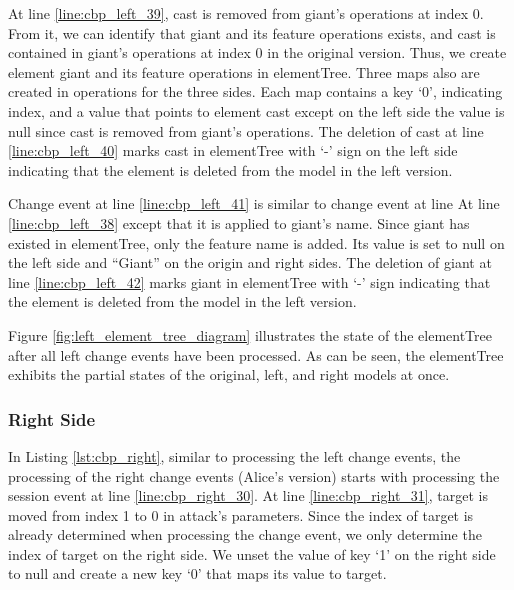 At line \ref{line:cbp_left_39}, \textsf{cast} is removed from \textsf{giant}'s \textsf{operations} at index 0. From it, we can identify that \textsf{giant} and its feature \textsf{operations} exists, and \textsf{cast} is contained in \textsf{giant}'s \textsf{operations} at index 0 in the original version. Thus, we create element \textsf{giant} and its feature \textsf{operations} in \textsf{elementTree}. Three maps also are created in \textsf{operations} for the three sides. Each map contains a key `0', indicating index, and a value that points to element \textsf{cast} except on the left side the value is null since \textsf{cast} is removed from \textsf{giant}'s \textsf{operations}. The deletion of \textsf{cast} at line \ref{line:cbp_left_40} marks \textsf{cast} in \textsf{elementTree} with `-' sign on the left side indicating that the element is deleted from the model in the left version.

Change event at line \ref{line:cbp_left_41} is similar to change event at line At line \ref{line:cbp_left_38} except that it is applied to \textsf{giant}'s \textsf{name}. Since \textsf{giant} has existed in \textsf{elementTree}, only the feature \textsf{name} is added. Its value is set to null on the left side and ``Giant'' on the origin and right sides. The deletion of \textsf{giant} at line \ref{line:cbp_left_42} marks \textsf{giant} in \textsf{elementTree} with `-' sign indicating that the element is deleted from the model in the left version.

Figure \ref{fig:left_element_tree_diagram} illustrates the state of the \textsf{elementTree} after all left change events have been processed. As can be seen, the \textsf{elementTree} exhibits the partial states of the original, left, and right models at once. 

\subsubsection{Right Side}\label{sec:right_side}
In Listing \ref{lst:cbp_right}, similar to processing the left change events, the processing of the right change events (Alice's version) starts with processing the session event at line \ref{line:cbp_right_30}. At line \ref{line:cbp_right_31}, \textsf{target} is moved from index 1 to 0 in \textsf{attack}'s \textsf{parameters}. Since the index of \textsf{target} is already determined when processing the change event, we only determine the index of \textsf{target} on the right side. We unset the value of key `1' on the right side to null and create a new key `0' that maps its value to \textsf{target}.

